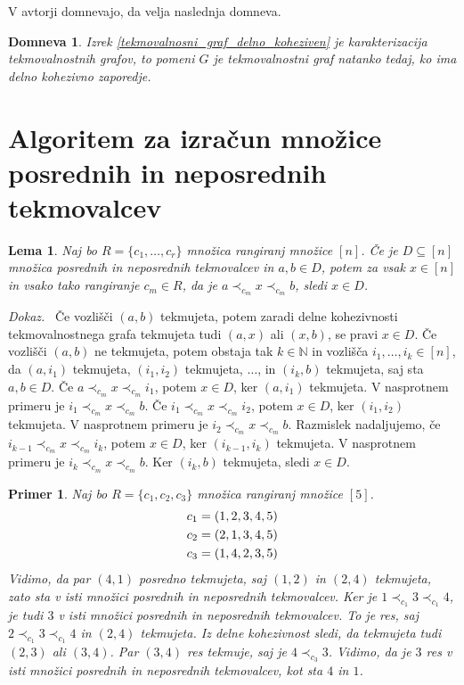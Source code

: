 \documentclass[a4paper, 12pt]{book}
\newtheorem{lema}{Lema}[chapter]
\newtheorem{domneva}{Domneva}[chapter]
\newtheorem{primer}{Primer}[chapter]
\newenvironment{dokaz}{\emph{Dokaz.}\ }{\hspace{\fill}{$\Box$}}
\begin{document}
V \cite{setsOfRankings} avtorji domnevajo, da velja naslednja domneva.

\begin{domneva}
    Izrek \ref{tekmovalnosni_graf_delno_koheziven} je karakterizacija tekmovalnostnih grafov, to pomeni $G$ je tekmovalnostni graf natanko tedaj, ko ima delno kohezivno zaporedje.
\end{domneva}

\section{ Algoritem za izračun množice posrednih in neposrednih tekmovalcev }

\begin{lema}
\label{lema_algoritem_posredni_tekmovalci_1}
    Naj bo $R = \{ c_1, \dots, c_r \}$ množica rangiranj množice $[n]$. Če je $D \subseteq [n]$ množica posrednih in neposrednih tekmovalcev in $a, b \in D$, potem za vsak $x \in [n]$ in vsako tako rangiranje $c_m \in R$, da je $a \prec_{c_m} x \prec_{c_m} b$, sledi $x \in D$.
\end{lema}
\begin{dokaz}
    Če vozlišči $(a, b)$ tekmujeta, potem zaradi delne kohezivnosti tekmovalnostnega grafa tekmujeta tudi $(a, x)$ ali $(x, b)$, se pravi $x \in D$. Če vozlišči $(a, b)$ ne tekmujeta, potem obstaja tak $k \in \mathbb{N}$ in vozlišča $i_1, \dots, i_k \in [n]$, da $(a, i_1)$ tekmujeta, $(i_1, i_2)$ tekmujeta, $\dots$, in $(i_k, b)$ tekmujeta, saj sta $a,b \in D$. Če $a \prec_{c_m} x \prec_{c_m} i_1$, potem $x \in D$, ker $(a, i_1)$ tekmujeta. V nasprotnem primeru je $i_1 \prec_{c_m} x \prec_{c_m} b$. Če $i_1 \prec_{c_m} x \prec_{c_m} i_2$, potem $x \in D$, ker $(i_1, i_2)$ tekmujeta. V nasprotnem primeru je $i_2 \prec_{c_m} x \prec_{c_m} b$. Razmislek nadaljujemo, če $i_{k-1} \prec_{c_m} x \prec_{c_m} i_k$, potem $x \in D$, ker $(i_{k-1}, i_k)$ tekmujeta. V nasprotnem primeru je $i_k \prec_{c_m} x \prec_{c_m} b$. Ker $(i_k, b)$ tekmujeta, sledi $x \in D$.
\end{dokaz}

\begin{primer}
    Naj bo $R = \{ c_1, c_2, c_3\}$ množica rangiranj množice $[5]$.
    \begin{align}
        c_1 &= (1, 2, 3, 4, 5) \notag\\
        c_2 &= (2, 1, 3, 4, 5) \notag\\
        c_3 &= (1, 4, 2, 3, 5) \notag
    \end{align}
    Vidimo, da par $(4, 1)$ posredno tekmujeta, saj $(1, 2)$ in $(2, 4)$ tekmujeta, zato sta v isti množici posrednih in neposrednih tekmovalcev. Ker je $1 \prec_{c_1} 3 \prec_{c_1} 4$, je tudi $3$ v isti množici posrednih in neposrednih tekmovalcev. To je res, saj $2 \prec_{c_1} 3 \prec_{c_1} 4$ in $(2, 4)$ tekmujeta. Iz delne kohezivnost sledi, da tekmujeta tudi $(2, 3)$ ali $(3, 4)$. Par $(3, 4)$ res tekmuje, saj je $4 \prec_{c_3} 3$. Vidimo, da je $3$ res v isti množici posrednih in neposrednih tekmovalcev, kot sta $4$ in $1$.
\end{primer}
\end{document}

